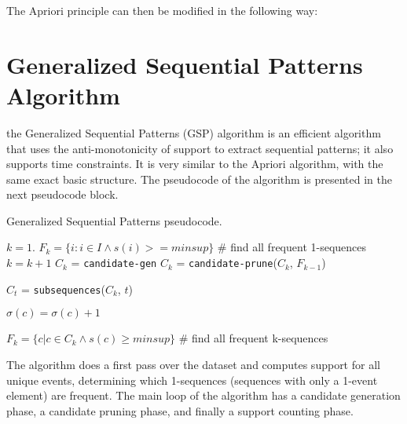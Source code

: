 The Apriori principle can then be modified in the following way:

\section{Generalized Sequential Patterns Algorithm}

the Generalized Sequential Patterns (GSP) algorithm is an efficient algorithm that uses the anti-monotonicity of support to extract sequential patterns; it also supports time constraints. It is very similar to the Apriori algorithm, with the same exact basic structure. The pseudocode of the algorithm is presented in the next pseudocode block.

\begin{algorithm}
\caption{Generalized Sequential Patterns pseudocode.}
\begin{algorithmic}[1]
    \State $k=1$.
    \State $F_k = \{ i : i \in I \land s(i) >= \textit{minsup} \}$ \# find all frequent 1-sequences
    \Repeat
        \State $k = k + 1$
        \State $C_k$ = \texttt{candidate-gen}
        \State $C_k$ = \texttt{candidate-prune}($C_k$, $F_{k-1}$)

            \State $C_t$ = \texttt{subsequences}($C_k$, $t$)

                \State $\sigma(c) = \sigma(c) + 1$
            \EndFor
        \EndFor

        \State $F_k = \{ c | c \in C_k \land s(c) \geq \textit{minsup} \}$ \# find all frequent k-sequences
\end{algorithmic}
\end{algorithm}
The algorithm does a first pass over the dataset and computes support for all unique events, determining which 1-sequences (sequences with only a 1-event element) are frequent. The main loop of the algorithm has a candidate generation phase, a candidate pruning phase, and finally a support counting phase.

